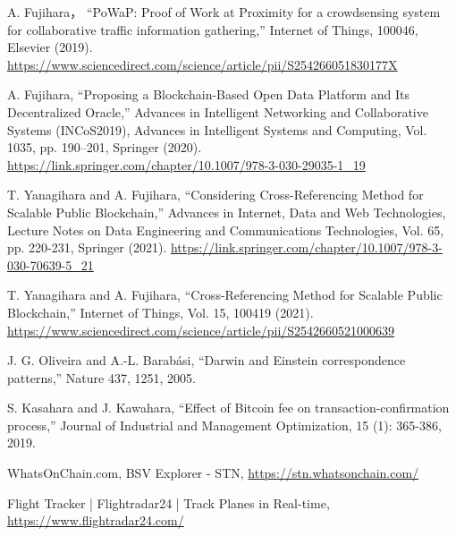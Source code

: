 \documentclass[graybox]{svmult}
\begin{document}
\begin{thebibliography}{99}
  A. Fujihara，
  ``PoWaP: Proof of Work at Proximity for a crowdsensing system for 
  collaborative traffic information gathering,'' 
  Internet of Things, 100046, Elsevier (2019).
  \url{https://www.sciencedirect.com/science/article/pii/S254266051830177X}

  A. Fujihara, 
  ``Proposing a Blockchain-Based Open Data Platform and Its Decentralized Oracle,''
  Advances in Intelligent Networking and Collaborative Systems (INCoS2019), 
  Advances in Intelligent Systems and Computing, 
  Vol. 1035, pp. 190--201, Springer (2020).
  \url{https://link.springer.com/chapter/10.1007/978-3-030-29035-1_19}


  T. Yanagihara and A. Fujihara, 
  ``Considering Cross-Referencing Method for Scalable Public Blockchain,''
  Advances in Internet, Data and Web Technologies, 
  Lecture Notes on Data Engineering and Communications Technologies, 
  Vol. 65, pp. 220-231, Springer (2021). 
  \url{https://link.springer.com/chapter/10.1007/978-3-030-70639-5_21}


  T. Yanagihara and A. Fujihara,
  ``Cross-Referencing Method for Scalable Public Blockchain,''
  Internet of Things, Vol. 15, 100419 (2021). 
  \url{https://www.sciencedirect.com/science/article/pii/S2542660521000639}



  J. G. Oliveira and A.-L. Barab\'asi,
  ``Darwin and Einstein correspondence patterns,'' 
  Nature 437, 1251, 2005.


  S. Kasahara and J. Kawahara,
  ``Effect of Bitcoin fee on transaction-confirmation process,''
  Journal of Industrial and Management Optimization, 15 (1): 365-386, 2019.


  WhatsOnChain.com, BSV Explorer - STN,
  \url{https://stn.whatsonchain.com/}



  Flight Tracker | Flightradar24 | Track Planes in Real-time,
  \url{https://www.flightradar24.com/}





%
%
%
%


\end{thebibliography}
\end{document}

